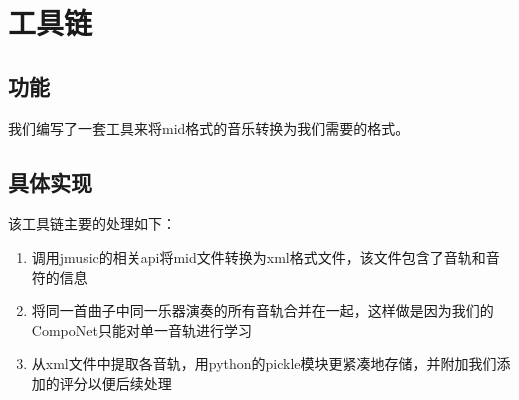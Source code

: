 \documentclass{article}
\begin{document}
\fi

  \section{工具链}
  \subsection{功能}
    我们编写了一套工具来将mid格式的音乐转换为我们需要的格式。
  \subsection{具体实现}
    该工具链主要的处理如下：
    \begin{enumerate}
    \item 调用jmusic的相关api将mid文件转换为xml格式文件，该文件包含了音轨和音符的信息
    \item 将同一首曲子中同一乐器演奏的所有音轨合并在一起，这样做是因为我们的CompoNet只能对单一音轨进行学习
    \item 从xml文件中提取各音轨，用python的pickle模块更紧凑地存储，并附加我们添加的评分以便后续处理
    \end{enumerate}

\ifx\allfiles\undefined
\end{document}
